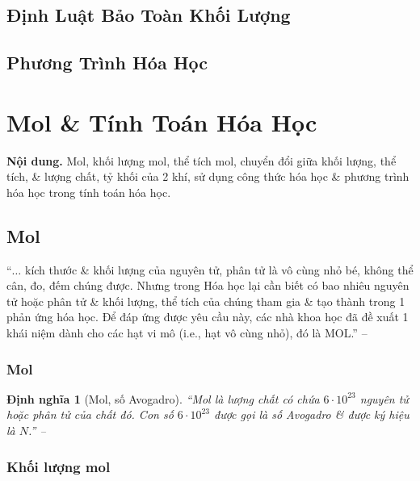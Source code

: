 \documentclass{article}
\numberwithin{equation}{section}
\newtheorem{dinhnghia}{Định nghĩa}[section]
\begin{document}

\subsection{Định Luật Bảo Toàn Khối Lượng}


\subsection{Phương Trình Hóa Học}


\section{Mol \& Tính Toán Hóa Học}
\textsf{\textbf{Nội dung.} Mol, khối lượng mol, thể tích mol, chuyển đổi giữa khối lượng, thể tích, \& lượng chất, tỷ khối của 2 khí, sử dụng công thức hóa học \& phương trình hóa học trong tính toán hóa học.}

\subsection{Mol}
``$\ldots$ kích thước \& khối lượng của nguyên tử, phân tử là vô cùng nhỏ bé, không thể cân, đo, đếm chúng được. Nhưng trong Hóa học lại cần biết có bao nhiêu nguyên tử hoặc phân tử \& khối lượng, thể tích của chúng tham gia \& tạo thành trong 1 phản ứng hóa học. Để đáp ứng được yêu cầu này, các nhà khoa học đã đề xuất 1 khái niệm dành cho các hạt vi mô (i.e., hạt vô cùng nhỏ), đó là MOL.'' -- \cite[p. 63]{SGK_Hoa_Hoc_8}

\subsubsection{Mol}

\begin{dinhnghia}[Mol, số Avogadro]
	``\emph{Mol} là lượng chất có chứa $6\cdot 10^{23}$ nguyên tử hoặc phân tử của chất đó. Con số $6\cdot 10^{23}$ được gọi là \emph{số Avogadro} \& được ký hiệu là $N$.'' -- \cite[p. 63]{SGK_Hoa_Hoc_8}
\end{dinhnghia}

\subsubsection{Khối lượng mol}
\end{document}
